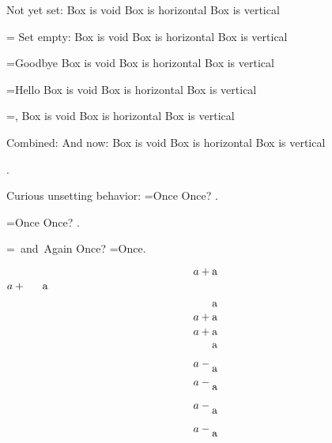 \documentclass{article}
\def\testbox#1{%
 \ifvoid#1 Box \string#1 is void
 \else\ifhbox#1 Box \string#1 is horizontal
 \else\ifvbox#1 Box \string#1 is vertical
 \fi\fi\fi
 \par}
\begin{document}
\newbox\myboxA
\newbox\myboxB
\newbox\myboxC
Not yet set:\testbox{\myboxA}
\setbox\myboxA=\hbox{}
Set empty:\testbox{\myboxA}
\setbox\myboxA=\hbox{Goodbye}
\testbox{\myboxA}
\setbox\myboxB=\hbox{Hello}
\testbox{\myboxB}
\setbox\myboxC=\vbox{\box\myboxB,\box\myboxA}
\testbox{\myboxC}

Combined: \box\myboxC
And now: \testbox{\myboxA}.

Curious unsetting behavior:
\setbox\myboxA=\hbox{Once}
Once? \box\myboxA \box\myboxA.

\setbox\myboxA=\hbox{Once}
Once? {\box\myboxA\box\myboxA}\box\myboxA\box\myboxA.

\setbox\myboxA=\hbox{ and Again}
Once? {\setbox\myboxA=\hbox{Once}\box\myboxA\box\myboxA}\box\myboxA\box\myboxA.

\[ a + \hbox{a}\]
\[ a + \vbox{a}\]

\[ a + \vbox{\hbox{a}\hbox{a}} \]
\[ a + \vtop{\hbox{a}\hbox{a}} \]

\[ a - \lower1ex\vtop{\hbox{a}} \]
\[ a - \lower1ex\vbox{\hbox{a}} \]

\[ a - \lower1ex\hbox{a} \]

\def\mybox#1{\hbox{#1}}
\[ a - \lower1ex\mybox{a} \]
\end{document}
